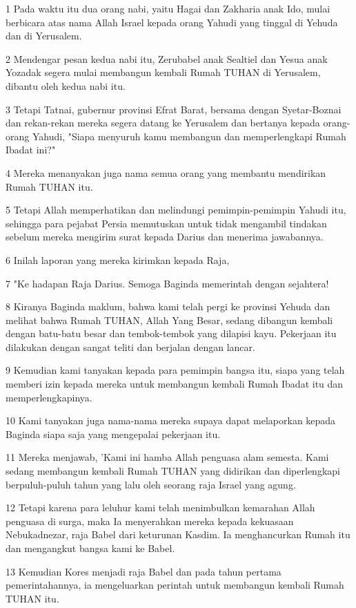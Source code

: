 \par 1 Pada waktu itu dua orang nabi, yaitu Hagai dan Zakharia anak Ido, mulai berbicara atas nama Allah Israel kepada orang Yahudi yang tinggal di Yehuda dan di Yerusalem.
\par 2 Mendengar pesan kedua nabi itu, Zerubabel anak Sealtiel dan Yesua anak Yozadak segera mulai membangun kembali Rumah TUHAN di Yerusalem, dibantu oleh kedua nabi itu.
\par 3 Tetapi Tatnai, gubernur provinsi Efrat Barat, bersama dengan Syetar-Boznai dan rekan-rekan mereka segera datang ke Yerusalem dan bertanya kepada orang-orang Yahudi, "Siapa menyuruh kamu membangun dan memperlengkapi Rumah Ibadat ini?"
\par 4 Mereka menanyakan juga nama semua orang yang membantu mendirikan Rumah TUHAN itu.
\par 5 Tetapi Allah memperhatikan dan melindungi pemimpin-pemimpin Yahudi itu, sehingga para pejabat Persia memutuskan untuk tidak mengambil tindakan sebelum mereka mengirim surat kepada Darius dan menerima jawabannya.
\par 6 Inilah laporan yang mereka kirimkan kepada Raja,
\par 7 "Ke hadapan Raja Darius. Semoga Baginda memerintah dengan sejahtera!
\par 8 Kiranya Baginda maklum, bahwa kami telah pergi ke provinsi Yehuda dan melihat bahwa Rumah TUHAN, Allah Yang Besar, sedang dibangun kembali dengan batu-batu besar dan tembok-tembok yang dilapisi kayu. Pekerjaan itu dilakukan dengan sangat teliti dan berjalan dengan lancar.
\par 9 Kemudian kami tanyakan kepada para pemimpin bangsa itu, siapa yang telah memberi izin kepada mereka untuk membangun kembali Rumah Ibadat itu dan memperlengkapinya.
\par 10 Kami tanyakan juga nama-nama mereka supaya dapat melaporkan kepada Baginda siapa saja yang mengepalai pekerjaan itu.
\par 11 Mereka menjawab, 'Kami ini hamba Allah penguasa alam semesta. Kami sedang membangun kembali Rumah TUHAN yang didirikan dan diperlengkapi berpuluh-puluh tahun yang lalu oleh seorang raja Israel yang agung.
\par 12 Tetapi karena para leluhur kami telah menimbulkan kemarahan Allah penguasa di surga, maka Ia menyerahkan mereka kepada kekuasaan Nebukadnezar, raja Babel dari keturunan Kasdim. Ia menghancurkan Rumah itu dan mengangkut bangsa kami ke Babel.
\par 13 Kemudian Kores menjadi raja Babel dan pada tahun pertama pemerintahannya, ia mengeluarkan perintah untuk membangun kembali Rumah TUHAN itu.
